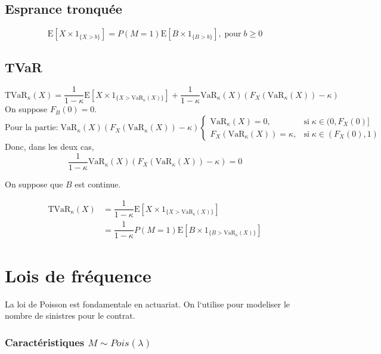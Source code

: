 \documentclass[]{book}
\theoremstyle{definition}
\theoremstyle{definition}
\theoremstyle{definition}
\theoremstyle{remark}
\begin{document}
\subsection{Esprance tronquée}\label{esprance-tronquee}

\[
\text{E}\left [X\times 1_{\{X>b\}}\right ]=P(M=1)\text{E}\left [B\times 1_{\{B>b\}}\right ],\; \text{pour}\;b\geq 0
\]

\subsection{TVaR}\label{tvar}

\[
\text{TVaR}_\kappa (X)=\dfrac{1}{1-\kappa}\text{E}\left [X\times 1_{\{X>\text{VaR}_\kappa (X) \}}\right ]+\dfrac{1}{1-\kappa}\text{VaR}_\kappa (X) \left (F_X(\text{VaR}_\kappa (X) )-\kappa\right )
\] On suppose \(F_B(0)=0\). \[
\text{Pour la partie:}\; \text{VaR}_\kappa (X) \left (F_X(\text{VaR}_\kappa (X) )-\kappa\right )\begin{cases}
\text{VaR}_\kappa (X) =0,& \text{si}\;\kappa \in(0,F_X(0)]\\
F_X(\text{VaR}_\kappa (X) )=\kappa,& \text{si}\;\kappa\in(F_X(0),1)
\end{cases}
\] Donc, dans les deux cas, \[
\dfrac{1}{1-\kappa}\text{VaR}_\kappa (X) \left (F_X(\text{VaR}_\kappa (X) )-\kappa\right )=0
\]

On suppose que \(B\) est continue.

\begin{align*}
\text{TVaR}_\kappa (X)& =\dfrac{1}{1-\kappa}\text{E}\left [X\times 1_{\{X>\text{VaR}_\kappa (X) \}}\right ]\\
& = \dfrac{1}{1-\kappa} P(M=1)\text{E}\left [B\times 1_{\{B>\text{VaR}_\kappa (X) \}}\right ]
\end{align*}

\section{Lois de fréquence}\label{lois-de-frequence}

La loi de Poisson est fondamentale en actuariat. On l`utilise pour
modeliser le nombre de sinistres pour le contrat.

\subsubsection*{\texorpdfstring{Caractéristiques
\(M \sim Pois(\lambda)\)}{Caractéristiques M \textbackslash{}sim Pois(\textbackslash{}lambda)}}\label{caracteristiques-m-sim-poislambda}
\end{document}
